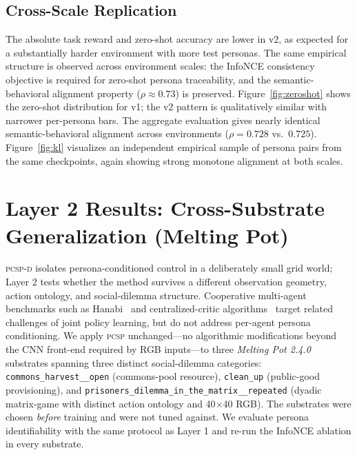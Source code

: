 \documentclass[conference]{IEEEtran}
\newcommand{\PCSP}{\textsc{pcsp}\xspace}
\newcommand{\PCSPD}{\textsc{pcsp-d}\xspace}
\begin{document}
\subsection{Cross-Scale Replication}

The absolute task reward and zero-shot accuracy are lower in v2, as expected for
a substantially harder environment with more test personas.
The same empirical structure is observed across environment scales: the InfoNCE
consistency objective is required for zero-shot persona traceability, and the
semantic-behavioral alignment property ($\rho \approx 0.73$) is preserved.
Figure~\ref{fig:zeroshot} shows the zero-shot distribution for v1;
the v2 pattern is qualitatively similar with narrower per-persona bars.
The aggregate evaluation gives nearly identical semantic-behavioral alignment
across environments ($\rho\!=\!0.728$ vs.\ $0.725$). Figure~\ref{fig:kl}
visualizes an independent empirical sample of persona pairs from the same
checkpoints, again showing strong monotone alignment at both scales.


\section{Layer 2 Results: Cross-Substrate Generalization (Melting Pot)}
\label{sec:meltingpot}

\PCSPD{} isolates persona-conditioned control in a deliberately small grid
world; Layer 2 tests whether the method survives a different observation
geometry, action ontology, and social-dilemma structure. Cooperative
multi-agent benchmarks such as Hanabi~\cite{bard2020hanabi} and centralized-critic
algorithms~\cite{foerster2018coma,lowe2017maddpg} target related challenges of
joint policy learning, but do not address per-agent persona conditioning. We apply \PCSP{}
unchanged---no algorithmic modifications beyond the CNN front-end required
by RGB inputs---to three \textit{Melting Pot
2.4.0}~\cite{leibo2021meltingpot} substrates spanning three distinct
social-dilemma categories: \texttt{commons\_harvest\_\_open} (commons-pool
resource), \texttt{clean\_up} (public-good provisioning), and
\texttt{prisoners\_dilemma\_in\_the\_matrix\_\_repeated} (dyadic
matrix-game with distinct action ontology and 40$\times$40 RGB). The
substrates were chosen \emph{before} training and were not tuned against.
We evaluate persona identifiability with the same protocol as Layer 1 and
re-run the InfoNCE ablation in every substrate.
\end{document}
